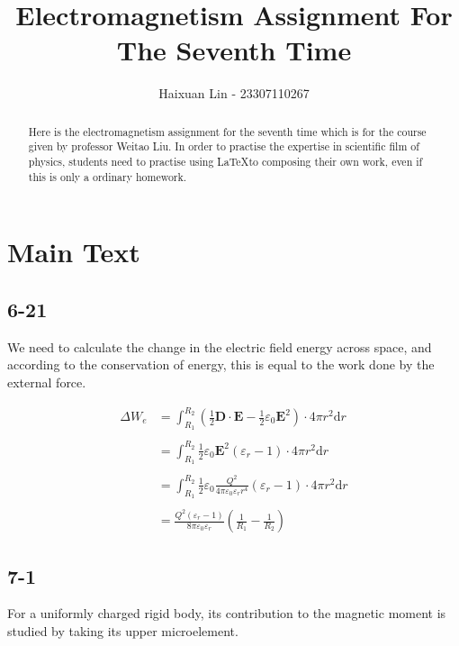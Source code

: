 \documentclass[a4paper,11pt]{amsart}
\title{Electromagnetism Assignment For The Seventh Time}
\author{Haixuan Lin - 23307110267}
\theoremstyle{definition}
\begin{document}
	
	\begin{abstract}
		Here is the electromagnetism assignment for the seventh time which is for the course given by professor Weitao Liu. In order to practise the expertise in scientific film of physics, students need to practise using \LaTeX to composing their own work, even if this is only a ordinary homework.
	\end{abstract}
	
	\maketitle
	\section*{Main Text}
	
	\subsection*{6-21}
	
	We need to calculate the change in the electric field energy across space, and according to the conservation of energy, this is equal to the work done by the external force.
	
	\begin{align}
		\Delta W_e&=\int_{R_1}^{R_2}{\left( \frac{1}{2}\boldsymbol{D}\cdot \boldsymbol{E}-\frac{1}{2}\varepsilon _0\boldsymbol{E}^2 \right) \cdot 4\pi r^2\mathrm{d}r}
		\\\\
		&=\int_{R_1}^{R_2}{\frac{1}{2}\varepsilon _0\boldsymbol{E}^2\left( \varepsilon _r-1 \right) \cdot 4\pi r^2\mathrm{d}r}
		\\\\
		&=\int_{R_1}^{R_2}{\frac{1}{2}\varepsilon _0\frac{Q^2}{4\pi \varepsilon _0\varepsilon _rr^4}\left( \varepsilon _r-1 \right) \cdot 4\pi r^2\mathrm{d}r}
		\\\\
		&=\frac{Q^2\left( \varepsilon _r-1 \right)}{8\pi \varepsilon _0\varepsilon _r}\left( \frac{1}{R_1}-\frac{1}{R_2} \right) 
	\end{align}
	
	\subsection*{7-1}
	
	For a uniformly charged rigid body, its contribution to the magnetic moment is studied by taking its upper microelement.
	
\end{document}
